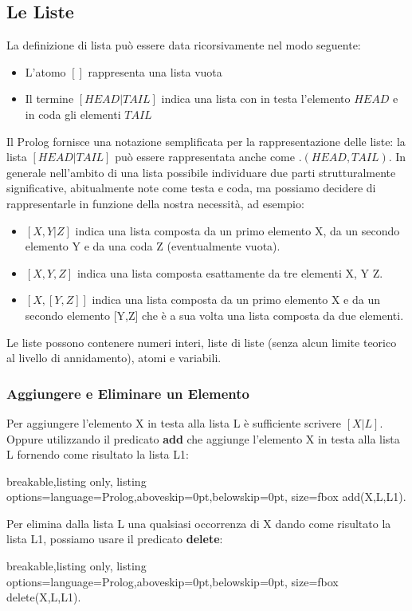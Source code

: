 \subsection{Le Liste}
La definizione di lista può essere data ricorsivamente nel modo seguente:
\begin{itemize}
    \item L'atomo $[]$ rappresenta una lista vuota
    \item Il termine $[HEAD|TAIL]$ indica una lista con in testa l'elemento $HEAD$ e in coda gli elementi $TAIL$
\end{itemize}

Il Prolog fornisce una notazione semplificata per la rappresentazione delle liste: la lista $[HEAD|TAIL]$ può essere rappresentata anche come $.(HEAD,TAIL)$. In generale nell'ambito di una lista possibile individuare due parti strutturalmente significative, abitualmente note come testa e coda, ma possiamo decidere di rappresentarle in funzione della nostra necessità, ad esempio:
\begin{itemize}
    \item $[X,Y|Z]$ indica una lista composta da un primo elemento X, da un secondo elemento Y e da una coda Z (eventualmente vuota).
    \item $[X,Y,Z]$ indica una lista composta esattamente da tre elementi X, Y Z.
    \item $[X,[Y,Z]]$ indica una lista composta da un primo elemento X e da un secondo elemento [Y,Z] che è a sua volta una lista composta da due elementi.
\end{itemize}

Le liste possono contenere numeri interi, liste di liste (senza alcun limite teorico al livello di annidamento), atomi e variabili. 

\subsubsection{Aggiungere e Eliminare un Elemento}
Per aggiungere l'elemento X in testa alla lista L è sufficiente scrivere $[X|L]$. Oppure utilizzando il predicato \textbf{add} che aggiunge l'elemento X in testa alla lista L fornendo come risultato la lista L1:
\begin{tcblisting}{breakable,listing only, listing options={language=Prolog,aboveskip=0pt,belowskip=0pt}, size=fbox}
add(X,L,L1).
\end{tcblisting}

Per elimina dalla lista L una qualsiasi occorrenza di X dando come risultato la lista L1, possiamo usare il predicato \textbf{delete}:
\begin{tcblisting}{breakable,listing only, listing options={language=Prolog,aboveskip=0pt,belowskip=0pt}, size=fbox}
delete(X,L,L1).
\end{tcblisting}

